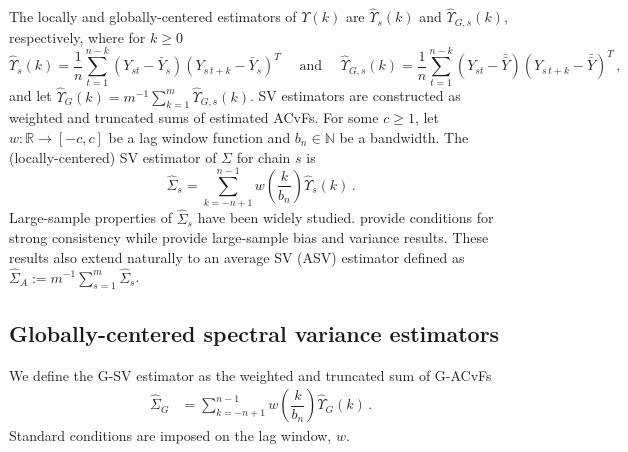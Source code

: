 \documentclass[11pt]{article}
\newcommand{\ds}{\displaystyle}
\theoremstyle{remark}
\begin{document}
The locally and globally-centered  estimators of $\Upsilon(k)$ are $\hat{\Upsilon}_s(k)$ and $\hat{\Upsilon}_{G,s}(k)$, respectively, where for $k \geq 0$
\[
\hat{\Upsilon}_s(k) = \dfrac{1}{n} \ds \sum_{t=1}^{n - k} (Y_{st} - \bar{Y}_s)(Y_{s\,t+k} - \bar{Y}_s)^T \quad \text{ and } \quad \hat{\Upsilon}_{G,s}(k) = \dfrac{1}{n} \ds \sum_{t=1}^{n - k} (Y_{st} - \bar{\bar{Y}})(Y_{s\,t+k} - \bar{\bar{Y}})^T\,,
\] 
and let $\hat{\Upsilon}_G(k) = m^{-1} \sum_{k=1}^{m}\hat{\Upsilon}_{G,s}(k)$. SV estimators are constructed as weighted and truncated sums of estimated ACvFs. For some $c \geq 1$, let $w: \mathbb{R} \to [-c,c]$ be a lag window function and $b_n \in \mathbb{N}$ be a bandwidth. The (locally-centered) SV estimator of $\Sigma$ for chain $s$ is
%
%
\begin{equation} \label{eq:sve}
    \hat{\Sigma}_{s} = \sum_{k=-n+1}^{n-1}w\left(\dfrac{k}{b_n}\right)\hat{\Upsilon}_s(k)\,.
\end{equation}
Large-sample properties of $\hat{\Sigma}_s$ have been widely studied. \cite{vats:fleg:jon:2018} provide conditions for strong consistency while \cite{fleg:jone:2010,hannan:1970} provide large-sample bias and variance results. These results also extend naturally to an average SV (ASV) estimator defined as $\hat{\Sigma}_A := m^{-1} \sum_{s=1}^{m}\hat{\Sigma}_{s}$.


\subsection{Globally-centered spectral variance estimators} %
\label{sub:globally_centered_spectral_variance_estimators}


We define the G-SV estimator as the weighted and truncated sum of G-ACvFs
%
\begin{align*}
    \hat{\Sigma}_{G} &= \sum_{k=-n+1}^{n-1}w\left(\dfrac{k}{b_n}\right)\hat{\Upsilon}_{G}(k)\,.
\end{align*}
%
Standard conditions are imposed on the lag window, $w$. 
%
\end{document}
